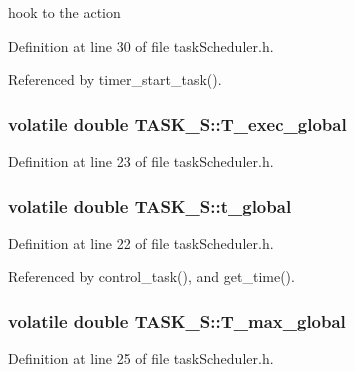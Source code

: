 hook to the action 



Definition at line 30 of file task\-Scheduler.\-h.



Referenced by timer\-\_\-start\-\_\-task().

\hypertarget{structTASK__S_ae06b712fd9963cff8192e9ef3140bc6d}{
\subsubsection[{T\-\_\-exec\-\_\-global}]{\setlength{\rightskip}{0pt plus 5cm}volatile double T\-A\-S\-K\-\_\-\-S\-::\-T\-\_\-exec\-\_\-global}}\label{structTASK__S_ae06b712fd9963cff8192e9ef3140bc6d}


Definition at line 23 of file task\-Scheduler.\-h.

\hypertarget{structTASK__S_a29a175bdd4b9f880a2b69bb5186e3c7e}{
\subsubsection[{t\-\_\-global}]{\setlength{\rightskip}{0pt plus 5cm}volatile double T\-A\-S\-K\-\_\-\-S\-::t\-\_\-global}}\label{structTASK__S_a29a175bdd4b9f880a2b69bb5186e3c7e}


Definition at line 22 of file task\-Scheduler.\-h.



Referenced by control\-\_\-task(), and get\-\_\-time().

\hypertarget{structTASK__S_a430c874cbf361b6dbc75ad1540880948}{
\subsubsection[{T\-\_\-max\-\_\-global}]{\setlength{\rightskip}{0pt plus 5cm}volatile double T\-A\-S\-K\-\_\-\-S\-::\-T\-\_\-max\-\_\-global}}\label{structTASK__S_a430c874cbf361b6dbc75ad1540880948}


Definition at line 25 of file task\-Scheduler.\-h.

